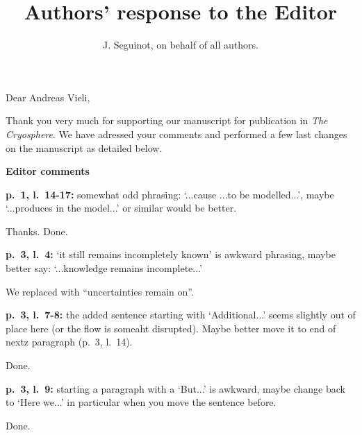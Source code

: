 

\title{Authors' response to the Editor}
\author{J. Seguinot, on behalf of all authors.}


\thispagestyle{empty}
\maketitle
\bigskip


\newcommand{\sechead}[1]{\bigskip\noindent\textbf{#1}}
\newcommand{\referee}[1]{\bigskip\noindent\textcolor{journalname}{#1}}

    Dear Andreas Vieli,

    Thank you very much for supporting our manuscript for publication in
    \emph{The Cryosphere}. We have adressed your comments and performed a few
    last changes on the manuscript as detailed below.



\sechead{Editor comments}

    \referee{\textbf{p.~1, l.~14-17:}
        somewhat odd phrasing: `...cause ...to be modelled...', maybe
        `...produces in the model...' or similar would be better.}

    Thanks. Done.

    \referee{\textbf{p.~3, l.~4:}
        `it still remains incompletely known' is awkward phrasing, maybe better
        say: `...knowledge remains incomplete...'}

    We replaced with ``uncertainties remain on''.

    \referee{\textbf{p.~3, l.~7-8:}
        the added sentence starting with `Additional...' seems slightly out of
        place here (or the flow is someaht disrupted). Maybe better move it to
        end of nextz paragraph (p.~3, l.~14).}

    Done.

    \referee{\textbf{p.~3, l.~9:}
        starting a paragraph with a `But...' is awkward, maybe change back to
        `Here we...' in particular when you move the sentence before.}

    Done.

